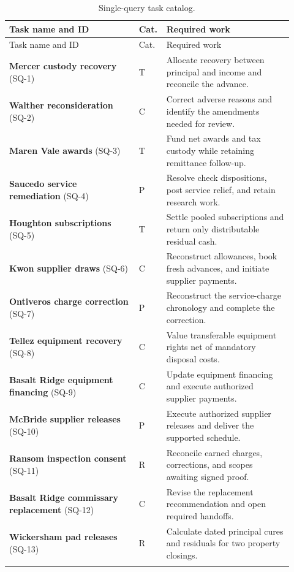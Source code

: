 \documentclass[11pt,letterpaper]{article}
\begin{document}
\begin{longtable}{@{}p{0.44\linewidth}p{0.05\linewidth}p{0.43\linewidth}@{}}
\caption{Single-query task catalog.}\\
\toprule Task name and ID & Cat. & Required work\\\midrule\endfirsthead
\toprule Task name and ID & Cat. & Required work\\\midrule\endhead
\textbf{Mercer custody recovery} (SQ-1) & T & Allocate recovery between principal and income and reconcile the advance.\\\addlinespace
\textbf{Walther reconsideration} (SQ-2) & C & Correct adverse reasons and identify the amendments needed for review.\\\addlinespace
\textbf{Maren Vale awards} (SQ-3) & T & Fund net awards and tax custody while retaining remittance follow-up.\\\addlinespace
\textbf{Saucedo service remediation} (SQ-4) & P & Resolve check dispositions, post service relief, and retain research work.\\\addlinespace
\textbf{Houghton subscriptions} (SQ-5) & T & Settle pooled subscriptions and return only distributable residual cash.\\\addlinespace
\textbf{Kwon supplier draws} (SQ-6) & C & Reconstruct allowances, book fresh advances, and initiate supplier payments.\\\addlinespace
\textbf{Ontiveros charge correction} (SQ-7) & P & Reconstruct the service-charge chronology and complete the correction.\\\addlinespace
\textbf{Tellez equipment recovery} (SQ-8) & C & Value transferable equipment rights net of mandatory disposal costs.\\\addlinespace
\textbf{Basalt Ridge equipment financing} (SQ-9) & C & Update equipment financing and execute authorized supplier payments.\\\addlinespace
\textbf{McBride supplier releases} (SQ-10) & P & Execute authorized supplier releases and deliver the supported schedule.\\\addlinespace
\textbf{Ransom inspection consent} (SQ-11) & R & Reconcile earned charges, corrections, and scopes awaiting signed proof.\\\addlinespace
\textbf{Basalt Ridge commissary replacement} (SQ-12) & C & Revise the replacement recommendation and open required handoffs.\\\addlinespace
\textbf{Wickersham pad releases} (SQ-13) & R & Calculate dated principal cures and residuals for two property closings.\\\addlinespace

\end{longtable}
\end{document}

